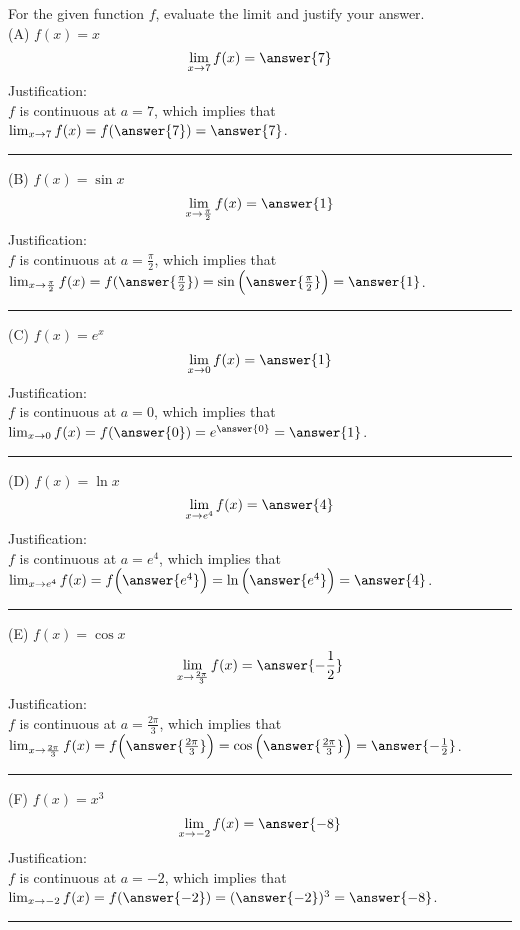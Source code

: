 \documentclass{ximera}
\author{Nela Lakos}
\begin{document}
\begin{exercise}


For the given function $f$, evaluate the limit and justify your answer.\\



(A) $f(x)=x$
 \[
\lim_{x\to 7}f(x) = \answer{7}
\] 
Justification:\\ $f$ is continuous at $a=7$, which implies that
$\lim_{x\to 7}f(x)=f(\answer{7})=\answer{7}$.

\noindent\rule[0.5ex]{\linewidth}{.2pt}

(B) $f(x)=\sin{x}$
 \[
\lim_{x\to \frac{\pi}{2}}f(x) = \answer{1}
\] 
Justification:\\ $f$ is continuous at $a=\frac{\pi}{2}$, which implies that\\[1em]
$\lim_{x\to \frac{\pi}{2}}f(x)=f(\answer{\frac{\pi}{2}})=\sin{\Bigl(\answer{\frac{\pi}{2}}\Bigr)}=\answer{1}$.

\noindent\rule[0.5ex]{\linewidth}{.2pt}

(C) $f(x)=e^{x}$
 \[
\lim_{x\to 0}f(x) = \answer{1}
\] 
Justification:\\ $f$ is continuous at $a=0$, which implies that\\[1em]
$\lim_{x\to 0}f(x)=f(\answer{0})=e^{\answer{0}}=\answer{1}$.

\noindent\rule[0.5ex]{\linewidth}{.2pt}

(D) $f(x)=\ln{x}$
 \[
\lim_{x\to e^{4}}f(x) = \answer{4}
\] 
Justification:\\ $f$ is continuous at $a=e^{4}$, which implies that\\[1em]
$\lim_{x\to e^{4}}f(x)=f\Bigl(\answer{e^{4}}\Bigr)=\ln{\Bigl(\answer{e^{4}}\Bigr)}=\answer{4}$.

\noindent\rule[0.5ex]{\linewidth}{.2pt}

(E) $f(x)=\cos{x}$
 \[
\lim_{x\to \frac{2\pi}{3}}f(x) = \answer{-\frac{1}{2}}
\] 
Justification:\\ $f$ is continuous at $a= \frac{2\pi}{3}$, which implies that\\[1em]
$\lim_{x\to \frac{2\pi}{3}}f(x)=f\Bigl(\answer{ \frac{2\pi}{3}}\Bigr)=\cos{\Bigl(\answer{ \frac{2\pi}{3}}\Bigr)}=\answer{-\frac{1}{2}}$.

\noindent\rule[0.5ex]{\linewidth}{.2pt}

(F) $f(x)=x^3$
 \[
\lim_{x\to -2}f(x) = \answer{-8}
\] 
Justification:\\ $f$ is continuous at $a=-2$, which implies that\\[1em]
$\lim_{x\to -2}f(x)=f(\answer{ -2})=(\answer{-2 })^3=\answer{-8}$.

\noindent\rule[0.5ex]{\linewidth}{.2pt}
\end{exercise}
\end{document}
